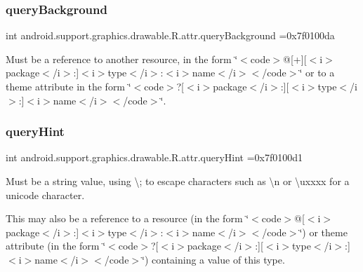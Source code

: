 \subsubsection{\texorpdfstring{query\+Background}{queryBackground}}
{\footnotesize\ttfamily int android.\+support.\+graphics.\+drawable.\+R.\+attr.\+query\+Background =0x7f0100da\hspace{0.3cm}{\ttfamily [static]}}

Must be a reference to another resource, in the form \char`\"{}$<$code$>$@\mbox{[}+\mbox{]}\mbox{[}$<$i$>$package$<$/i$>$\+:\mbox{]}$<$i$>$type$<$/i$>$\+:$<$i$>$name$<$/i$>$$<$/code$>$\char`\"{} or to a theme attribute in the form \char`\"{}$<$code$>$?\mbox{[}$<$i$>$package$<$/i$>$\+:\mbox{]}\mbox{[}$<$i$>$type$<$/i$>$\+:\mbox{]}$<$i$>$name$<$/i$>$$<$/code$>$\char`\"{}. \mbox{\label{classandroid_1_1support_1_1graphics_1_1drawable_1_1R_1_1attr_aac93634d3122503051a0aba99d5962f8}} 
\subsubsection{\texorpdfstring{query\+Hint}{queryHint}}
{\footnotesize\ttfamily int android.\+support.\+graphics.\+drawable.\+R.\+attr.\+query\+Hint =0x7f0100d1\hspace{0.3cm}{\ttfamily [static]}}

Must be a string value, using \textquotesingle{}\textbackslash{};\textquotesingle{} to escape characters such as \textquotesingle{}\textbackslash{}n\textquotesingle{} or \textquotesingle{}\textbackslash{}uxxxx\textquotesingle{} for a unicode character. 

This may also be a reference to a resource (in the form \char`\"{}$<$code$>$@\mbox{[}$<$i$>$package$<$/i$>$\+:\mbox{]}$<$i$>$type$<$/i$>$\+:$<$i$>$name$<$/i$>$$<$/code$>$\char`\"{}) or theme attribute (in the form \char`\"{}$<$code$>$?\mbox{[}$<$i$>$package$<$/i$>$\+:\mbox{]}\mbox{[}$<$i$>$type$<$/i$>$\+:\mbox{]}$<$i$>$name$<$/i$>$$<$/code$>$\char`\"{}) containing a value of this type. \mbox{\label{classandroid_1_1support_1_1graphics_1_1drawable_1_1R_1_1attr_afbc62a0aae46ef6d698c9c9e0297cfa0}} 
